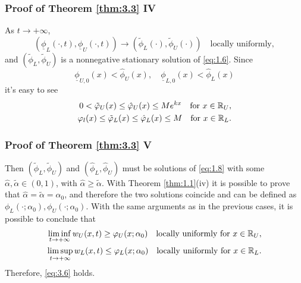 
\begin{frame}
    \frametitle{Proof of Theorem \ref{thm:3.3} IV}
    \begin{proofc}
        As \(t \to +\infty\),
        \[
            (\underline{\phi}_L(\cdot, t), \underline{\phi}_U(\cdot, t)) \to (\tilde{\phi}_L(\cdot), \tilde{\phi}_U(\cdot)) \quad \text{locally uniformly},
        \]
        and \((\tilde{\phi}_L, \tilde{\phi}_U)\) is a nonnegative stationary solution of \eqref{eq:1.6}. Since
        \[
            \underline{\phi}_{U,0}(x) < \hat{\phi}_U(x), \quad \underline{\phi}_{L,0}(x) < \hat{\phi}_L(x)
        \]
        it's easy to see
        \begin{align*}
            0 < \tilde{\varphi}_U(x) \leq \hat{\varphi}_U(x)  \leq M e^{kx} \quad \text{for } x \in \mathbb{R}_U, \\
            \varphi_l(x) \leq \tilde{\varphi}_L(x) \leq \hat{\varphi}_L(x) \leq M \quad \text{for } x \in \mathbb{R}_L.
        \end{align*}
    \end{proofc}
\end{frame}


\begin{frame}
    \frametitle{Proof of Theorem \ref{thm:3.3} V}
    \begin{proofe}
        Then \((\tilde{\phi}_L, \tilde{\phi}_U)\) and \((\hat{\phi}_L, \hat{\phi}_U)\) must be solutions of \eqref{eq:1.8} with some \(\hat{\alpha}, \tilde{\alpha} \in (0,1)\), with \(\hat{\alpha} \geq \tilde{\alpha}\). With Theorem \ref{thm:1.1}(iv) it is possible to prove that \(\hat{\alpha} = \tilde{\alpha} = \alpha_0\), and therefore the two solutions coincide and can be defined as \(\phi_L(\cdot; \alpha_0), \phi_U(\cdot; \alpha_0)\).
        With the same arguments as in the previous cases, it is possible to conclude that
        \begin{align*}
            \liminf_{t \to +\infty} w_U(x, t) \geq \varphi_U(x; \alpha_0) \quad \text{locally uniformly for } x \in \mathbb{R}_U, \\
            \limsup_{t \to +\infty} w_L(x, t) \leq \varphi_L(x; \alpha_0) \quad \text{locally uniformly for } x \in \mathbb{R}_L.
        \end{align*}
        Therefore, \eqref{eq:3.6} holds.
    \end{proofe}
\end{frame}